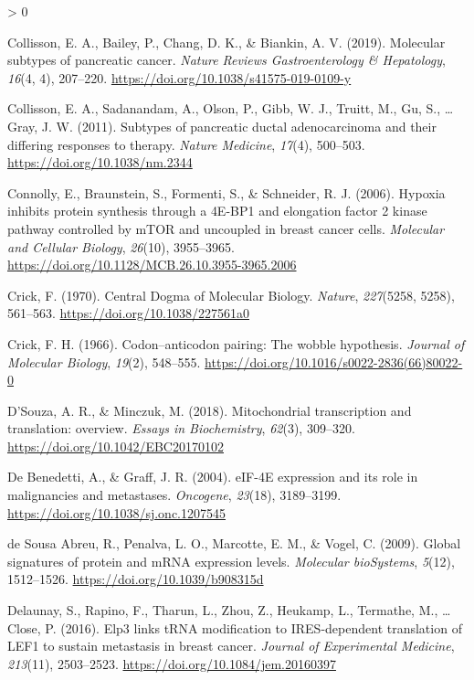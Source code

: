 \documentclass[
  12pt,
  openany]{book}
\newlength{\cslhangindent}
\newenvironment{CSLReferences}[2] %
 {%
  \setlength{\parindent}{0pt}
  \ifodd #1 \everypar{\setlength{\hangindent}{\cslhangindent}}\ignorespaces\fi
  \ifnum #2 > 0
  \setlength{\parskip}{#2\baselineskip}
  \fi
 }%
 {}
\begin{document}
\begin{CSLReferences}{1}{0}
\leavevmode\hypertarget{ref-Collisson2019}{}%
Collisson, E. A., Bailey, P., Chang, D. K., \& Biankin, A. V. (2019). Molecular subtypes of pancreatic cancer. \emph{Nature Reviews Gastroenterology \& Hepatology}, \emph{16}(4, 4), 207--220. \url{https://doi.org/10.1038/s41575-019-0109-y}

\leavevmode\hypertarget{ref-Collisson2011}{}%
Collisson, E. A., Sadanandam, A., Olson, P., Gibb, W. J., Truitt, M., Gu, S., \ldots{} Gray, J. W. (2011). Subtypes of pancreatic ductal adenocarcinoma and their differing responses to therapy. \emph{Nature Medicine}, \emph{17}(4), 500--503. \url{https://doi.org/10.1038/nm.2344}

\leavevmode\hypertarget{ref-Connolly2006}{}%
Connolly, E., Braunstein, S., Formenti, S., \& Schneider, R. J. (2006). Hypoxia inhibits protein synthesis through a {4E}-{BP1} and elongation factor 2 kinase pathway controlled by {mTOR} and uncoupled in breast cancer cells. \emph{Molecular and Cellular Biology}, \emph{26}(10), 3955--3965. \url{https://doi.org/10.1128/MCB.26.10.3955-3965.2006}

\leavevmode\hypertarget{ref-Crick1970}{}%
Crick, F. (1970). Central {Dogma} of {Molecular Biology}. \emph{Nature}, \emph{227}(5258, 5258), 561--563. \url{https://doi.org/10.1038/227561a0}

\leavevmode\hypertarget{ref-Crick1966}{}%
Crick, F. H. (1966). Codon--anticodon pairing: The wobble hypothesis. \emph{Journal of Molecular Biology}, \emph{19}(2), 548--555. \url{https://doi.org/10.1016/s0022-2836(66)80022-0}

\leavevmode\hypertarget{ref-DSouza2018}{}%
D'Souza, A. R., \& Minczuk, M. (2018). Mitochondrial transcription and translation: overview. \emph{Essays in Biochemistry}, \emph{62}(3), 309--320. \url{https://doi.org/10.1042/EBC20170102}

\leavevmode\hypertarget{ref-DeBenedetti2004}{}%
De Benedetti, A., \& Graff, J. R. (2004). {eIF}-{4E} expression and its role in malignancies and metastases. \emph{Oncogene}, \emph{23}(18), 3189--3199. \url{https://doi.org/10.1038/sj.onc.1207545}

\leavevmode\hypertarget{ref-deSousaAbreu2009}{}%
de Sousa Abreu, R., Penalva, L. O., Marcotte, E. M., \& Vogel, C. (2009). Global signatures of protein and {mRNA} expression levels. \emph{Molecular bioSystems}, \emph{5}(12), 1512--1526. \url{https://doi.org/10.1039/b908315d}

\leavevmode\hypertarget{ref-Delaunay2016}{}%
Delaunay, S., Rapino, F., Tharun, L., Zhou, Z., Heukamp, L., Termathe, M., \ldots{} Close, P. (2016). Elp3 links {tRNA} modification to {IRES}-dependent translation of {LEF1} to sustain metastasis in breast cancer. \emph{Journal of Experimental Medicine}, \emph{213}(11), 2503--2523. \url{https://doi.org/10.1084/jem.20160397}


\end{CSLReferences}
\end{document}
